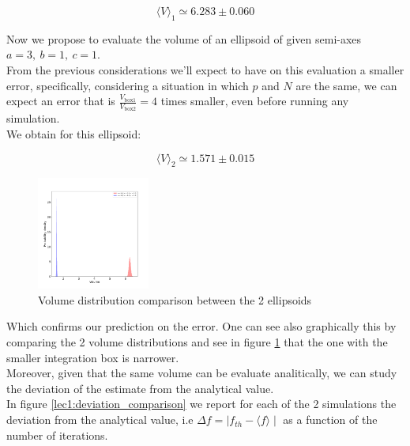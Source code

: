 $$\langle V \rangle_1 \simeq 6.283 \pm 0.060$$

Now we propose to evaluate the volume of an ellipsoid of given semi-axes $a=3,\ b=1,\ c=1$. \\
From the previous considerations we'll expect to have on this evaluation a smaller error, specifically, considering a situation in which $p$
and $N$ are the same, we can expect an error that is $\frac{V_{\text{box1}}}{V_{\text{box2}}} = 4$ times smaller, even before running any simulation. \\
We obtain for this ellipsoid:

$$\langle V \rangle_2 \simeq 1.571 \pm 0.015$$

\begin{figure}
  \vspace{-20pt}
  \centering
  \includegraphics[width=0.33\textwidth]{FIG/exercise_0_images/first_and_second_ellipsoid_distribution.png}
\caption{Volume distribution comparison between the 2 ellipsoids}
\label{lec1:first_and_second_ellipsoid}
\end{figure}

Which confirms our prediction on the error. One can see also graphically this by comparing the 2 volume distributions and see in figure \ref{lec1:first_and_second_ellipsoid} that the one with the
smaller integration box is narrower. \\
Moreover, given that the same volume can be evaluate analitically, we can study the deviation of the estimate from the analytical value. \\
In figure \ref{lec1:deviation_comparison} we report for each of the 2 simulations the deviation from the analytical value, i.e $\Delta f = \mid f_{th}-\langle f \rangle \mid $ as a function
of the number of iterations.

